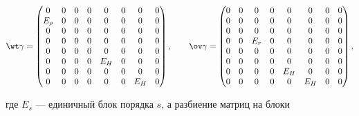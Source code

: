 \begin{equation}


\wt\gamma=


\begin{pmatrix}


0 & 0 & 0 & 0 & 0 & 0 & 0 & 0 \\


E_\rho & 0 & 0 & 0 & 0 & 0 & 0 & 0 \\


0 & 0 & 0 & 0 & 0 & 0 & 0 & 0 \\


0 & 0 & 0 & 0 & 0 & 0 & 0 & 0 \\


0 & 0 & 0 & 0 & 0 & 0 & 0 & 0 \\


0 & 0 & 0 & 0 & E_H & 0 & 0 & 0 \\


0 & 0 & 0 & 0 & 0 & 0 & 0 & 0 \\


0 & 0 & 0 & 0 & 0 & 0 & E_H & 0


\end{pmatrix}


,\qquad \ov\gamma=


\begin{pmatrix}


0 & 0 & 0 & 0 & 0 & 0 & 0 & 0 \\


0 & 0 & 0 & 0 & 0 & 0 & 0 & 0 \\


0 & 0 & 0 & 0 & 0 & 0 & 0 & 0 \\


0 & 0 & E_r & 0 & 0 & 0 & 0 & 0 \\


0 & 0 & 0 & 0 & 0 & 0 & 0 & 0 \\


0 & 0 & 0 & 0 & 0 & 0 & 0 & 0 \\


0 & 0 & 0 & 0 & E_H & 0 & 0 & 0 \\


0 & 0 & 0 & 0 & 0 & E_H & 0 & 0


\end{pmatrix}


,


\end{equation}


где $E_s$ --- единичный блок порядка $s$, а разбиение матриц на блоки


